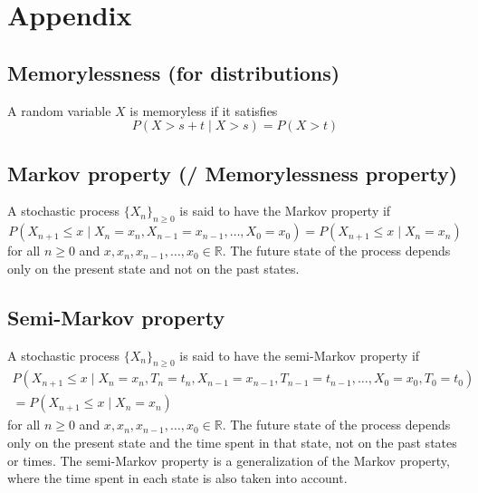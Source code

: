 \section{Appendix}

\subsection{Memorylessness (for distributions)}

A random variable \( X \) is memoryless if it satisfies
\begin{equation}
    P(X > s + t \mid X > s) = P(X > t)
\end{equation}

\subsection{Markov property (/ Memorylessness property)}

A stochastic process \( {\{ X_n \}}_{n \geq 0} \) is said to have the Markov property if
\begin{equation}
    P(X_{n+1} \leq x \mid X_n = x_n, X_{n-1} = x_{n-1}, \ldots, X_0 = x_0) = P(X_{n+1} \leq x \mid X_n = x_n)
\end{equation}
for all \( n \geq 0 \) and \( x, x_n, x_{n-1}, \ldots, x_0 \in \mathbb{R} \).
The future state of the process depends only on the present state and not on the past states.

\subsection{Semi-Markov property}

A stochastic process \( {\{ X_n \}}_{n \geq 0} \) is said to have the semi-Markov property if
\begin{equation}
    \begin{aligned}
        P(X_{n+1} \leq x \mid X_n = x_n, T_n = t_n, X_{n-1} = x_{n-1}, T_{n-1} = t_{n-1}, \ldots, X_0 = x_0, T_0 = t_0)
        \\ =
        P(X_{n+1} \leq x \mid X_n = x_n)
    \end{aligned}
\end{equation}
for all \( n \geq 0 \) and \( x, x_n, x_{n-1}, \ldots, x_0 \in \mathbb{R} \).
The future state of the process depends only on the present state and the time spent in that state, not on the past states or times.
The semi-Markov property is a generalization of the Markov property, where the time spent in each state is also taken into account.

